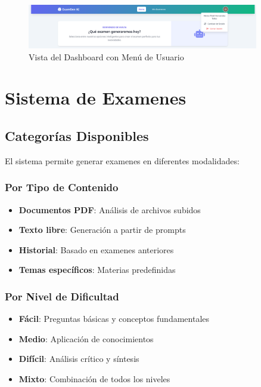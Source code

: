 \documentclass[12pt,a4paper]{report}
\begin{document}
\begin{figure}[h]
\centering
\includegraphics[width=0.9\textwidth]{250617_06h44m55s_screenshot.png}
\caption{Vista del Dashboard con Menú de Usuario}
\label{fig:dashboard_menu}
\end{figure}

\section{Sistema de Examenes}

\subsection{Categorías Disponibles}

El sistema permite generar examenes en diferentes modalidades:

\subsubsection{Por Tipo de Contenido}
\begin{itemize}
    \item \textbf{Documentos PDF}: Análisis de archivos subidos
    \item \textbf{Texto libre}: Generación a partir de prompts
    \item \textbf{Historial}: Basado en examenes anteriores
    \item \textbf{Temas específicos}: Materias predefinidas
\end{itemize}

\subsubsection{Por Nivel de Dificultad}
\begin{itemize}
    \item \textbf{Fácil}: Preguntas básicas y conceptos fundamentales
    \item \textbf{Medio}: Aplicación de conocimientos
    \item \textbf{Difícil}: Análisis crítico y síntesis
    \item \textbf{Mixto}: Combinación de todos los niveles
\end{itemize}
\end{document}
